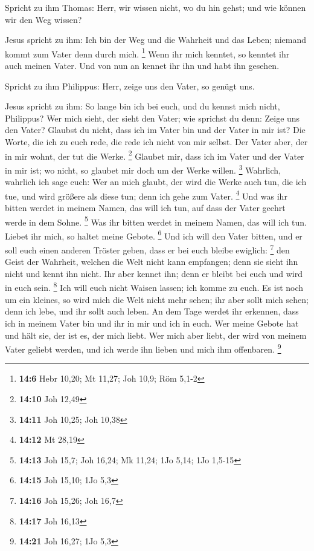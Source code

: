  Spricht zu ihm Thomas: Herr, wir wissen nicht, wo du hin
gehst; und wie können wir den Weg wissen?

 Jesus spricht zu ihm: Ich bin der Weg und die Wahrheit
und das Leben; niemand kommt zum Vater denn durch mich. \footnote{\textbf{14:6}
  Hebr 10,20; Mt 11,27; Joh 10,9; Röm 5,1-2}  Wenn ihr
mich kenntet, so kenntet ihr auch meinen Vater. Und von nun an kennet
ihr ihn und habt ihn gesehen.

 Spricht zu ihm Philippus: Herr, zeige uns den Vater, so
genügt uns.

 Jesus spricht zu ihm: So lange bin ich bei euch, und du
kennst mich nicht, Philippus? Wer mich sieht, der sieht den Vater; wie
sprichst du denn: Zeige uns den Vater?  Glaubst du nicht,
dass ich im Vater bin und der Vater in mir ist? Die Worte, die ich zu
euch rede, die rede ich nicht von mir selbst. Der Vater aber, der in mir
wohnt, der tut die Werke. \footnote{\textbf{14:10} Joh 12,49}
 Glaubet mir, dass ich im Vater und der Vater in mir ist;
wo nicht, so glaubet mir doch um der Werke willen. \footnote{\textbf{14:11}
  Joh 10,25; Joh 10,38}  Wahrlich, wahrlich ich sage
euch: Wer an mich glaubt, der wird die Werke auch tun, die ich tue, und
wird größere als diese tun; denn ich gehe zum Vater. \footnote{\textbf{14:12}
  Mt 28,19}  Und was ihr bitten werdet in meinem Namen,
das will ich tun, auf dass der Vater geehrt werde in dem Sohne.
\footnote{\textbf{14:13} Joh 15,7; Joh 16,24; Mk 11,24; 1Jo 5,14; 1Jo
  1,5-15}  Was ihr bitten werdet in meinem Namen, das
will ich tun.  Liebet ihr mich, so haltet meine Gebote.
\footnote{\textbf{14:15} Joh 15,10; 1Jo 5,3}  Und ich
will den Vater bitten, und er soll euch einen anderen Tröster geben,
dass er bei euch bleibe ewiglich: \footnote{\textbf{14:16} Joh 15,26;
  Joh 16,7}  den Geist der Wahrheit, welchen die Welt
nicht kann empfangen; denn sie sieht ihn nicht und kennt ihn nicht. Ihr
aber kennet ihn; denn er bleibt bei euch und wird in euch sein.
\footnote{\textbf{14:17} Joh 16,13}  Ich will euch nicht
Waisen lassen; ich komme zu euch.  Es ist noch um ein
kleines, so wird mich die Welt nicht mehr sehen; ihr aber sollt mich
sehen; denn ich lebe, und ihr sollt auch leben.  An dem
Tage werdet ihr erkennen, dass ich in meinem Vater bin und ihr in mir
und ich in euch.  Wer meine Gebote hat und hält sie, der
ist es, der mich liebt. Wer mich aber liebt, der wird von meinem Vater
geliebt werden, und ich werde ihn lieben und mich ihm offenbaren.
\footnote{\textbf{14:21} Joh 16,27; 1Jo 5,3}

